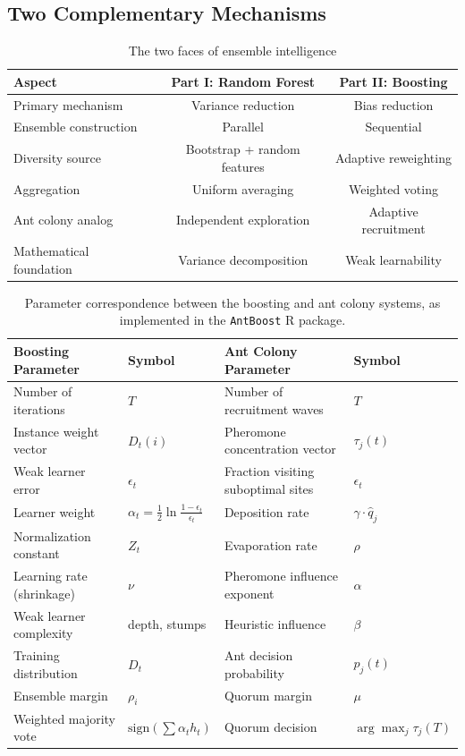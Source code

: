 \documentclass[12pt,letterpaper]{article}
\begin{document}
\subsection{Two Complementary Mechanisms}

\begin{table}[htbp]
\centering
\caption{The two faces of ensemble intelligence}
\label{tab:unified}
\begin{tabular}{l c c}
\hline
\textbf{Aspect} & \textbf{Part I: Random Forest} & \textbf{Part II: Boosting} \\
\hline
Primary mechanism & Variance reduction & Bias reduction \\
Ensemble construction & Parallel & Sequential \\
Diversity source & Bootstrap + random features & Adaptive reweighting \\
Aggregation & Uniform averaging & Weighted voting \\
Ant colony analog & Independent exploration & Adaptive recruitment \\
Mathematical foundation & Variance decomposition & Weak learnability \\
\hline
\end{tabular}
\end{table}

\begin{table}[htbp]
\centering
\caption{Parameter correspondence between the boosting and ant colony systems, as implemented in the \texttt{AntBoost} R package.}
\label{tab:parameter_correspondence}
\begin{tabular}{l l l l}
\hline
\textbf{Boosting Parameter} & \textbf{Symbol} & \textbf{Ant Colony Parameter} & \textbf{Symbol} \\
\hline
Number of iterations & $T$ & Number of recruitment waves & $T$ \\
Instance weight vector & $D_t(i)$ & Pheromone concentration vector & $\tau_j(t)$ \\
Weak learner error & $\epsilon_t$ & Fraction visiting suboptimal sites & $\epsilon_t$ \\
Learner weight & $\alpha_t = \frac{1}{2}\ln\frac{1-\epsilon_t}{\epsilon_t}$ & Deposition rate & $\gamma \cdot \hat{q}_j$ \\
Normalization constant & $Z_t$ & Evaporation rate & $\rho$ \\
Learning rate (shrinkage) & $\nu$ & Pheromone influence exponent & $\alpha$ \\
Weak learner complexity & depth, stumps & Heuristic influence & $\beta$ \\
Training distribution & $D_t$ & Ant decision probability & $p_j(t)$ \\
Ensemble margin & $\rho_i$ & Quorum margin & $\mu$ \\
Weighted majority vote & $\text{sign}(\sum \alpha_t h_t)$ & Quorum decision & $\arg\max_j \tau_j(T)$ \\
\hline
\end{tabular}
\end{table}
\end{document}
